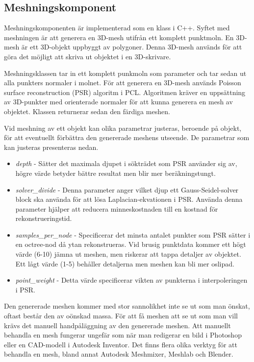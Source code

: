\documentclass[a4paper,titlepage,12pt]{article}
\begin{document}
	\subsection{Meshningskomponent}
		Meshningskomponenten är implementerad som en klass i C++. Syftet med meshningen är att generera en 3D-mesh utifrån ett komplett punktmoln. En 3D-mesh är ett 3D-objekt uppbyggt av polygoner. Denna 3D-mesh används för att göra det möjligt att skriva ut objektet i en 3D-skrivare. 
		
		Meshningsklassen tar in ett komplett punkmoln som parameter och tar sedan ut alla punkters normaler i molnet. För att generera en 3D-mesh används Poisson surface reconstruction (PSR) algoritm i PCL. Algoritmen kräver en uppsättning av 3D-punkter med orienterade normaler för att kunna generera en mesh av objektet. Klassen returnerar sedan den färdiga meshen.
		
		Vid meshning av ett objekt kan olika parametrar justeras, beroende på objekt, för att eventuellt förbättra den genererade meshens utseende. De parametrar som kan justeras presenteras nedan.
		
		\begin{itemize}
			\item \textit{depth} - Sätter det maximala djupet i sökträdet som PSR använder sig av, högre värde betyder bättre resultat men blir mer beräkningstungt.
			\item \textit{solver\_divide} - Denna parameter anger vilket djup ett Gauss-Seidel-solver block ska använda för att lösa Laplacian-ekvationen i PSR. Använda denna parameter hjälper att reducera minneskostnaden till en kostnad för rekonstrueringstid.
			\item \textit{samples\_per\_node} - Specificerar det minsta antalet punkter som PSR sätter i en octree-nod då ytan rekonstrueras. Vid brusig punktdata kommer ett högt värde (6-10) jämna ut meshen, men riskerar att tappa detaljer av objektet. Ett lågt värde (1-5) behåller detaljerna men meshen kan bli mer oslipad.
			\item \textit{point\_weight} -  Detta värde specificerar vikten av punkterna i interpoleringen i PSR.
		\end{itemize}
	
		Den genererade meshen kommer med stor sannolikhet inte se ut som man önskat, oftast består den av oönskad massa. För att få meshen att se ut som man vill krävs det manuell handpåläggning av den genererade meshen. Att manuellt behandla en mesh fungerar ungefär som när man redigerar en bild i Photoshop eller en CAD-modell i Autodesk Inventor. Det finns flera olika verktyg för att behandla en mesh, bland annat Autodesk Meshmixer, Meshlab och Blender.
		
\end{document}
